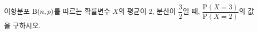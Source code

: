 이항분포 $\mathrm{B}(n{,}\mkern3mu\mathopen{}p)$를 따르는 확률변수 $X$의 평균이 $2$, 분산이 $\dfrac{3}{2}$일 때, $\dfrac{\mathrm{P}(X=3)}{\mathrm{P}(X=2)}$의 값을 구하시오.
